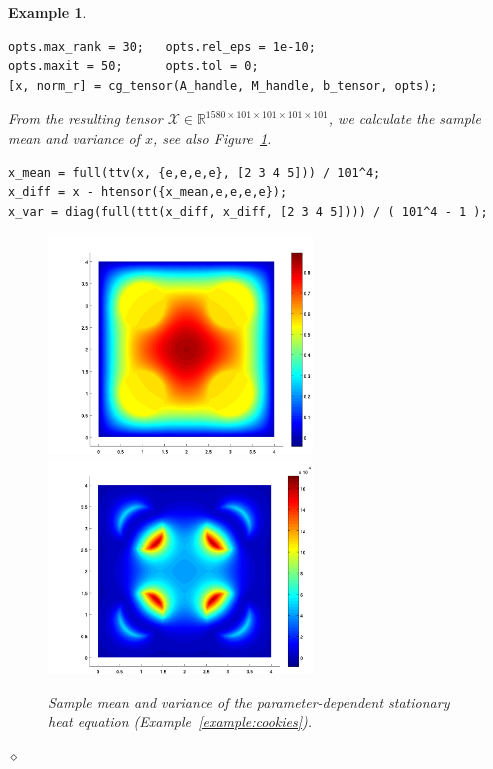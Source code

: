 \documentclass[11pt, a4paper]{article}
\newcommand{\calX}{\mathcal{X}}
\newcommand{\R}{{\mathbb R}}
\newtheorem{example}[theorem]{\bf Example}
\begin{document}
\begin{example}
\begin{framed}
\begin{verbatim}
opts.max_rank = 30;   opts.rel_eps = 1e-10;
opts.maxit = 50;      opts.tol = 0;
[x, norm_r] = cg_tensor(A_handle, M_handle, b_tensor, opts);
\end{verbatim}
\vspace{-2ex} 
\end{framed}

\noindent From the resulting tensor $\calX \in \R^{1580 \times 101 \times 101 \times 101 \times 101}$, we calculate the sample mean and variance of $x$, see also Figure~\ref{fig:cookies_mean_var}.
\begin{framed}\small \noindent
\vspace{-3ex} 
\begin{verbatim}
x_mean = full(ttv(x, {e,e,e,e}, [2 3 4 5])) / 101^4;
x_diff = x - htensor({x_mean,e,e,e,e});
x_var = diag(full(ttt(x_diff, x_diff, [2 3 4 5]))) / ( 101^4 - 1 );
\end{verbatim}
\vspace{-2ex} 
\end{framed}
\begin{figure}
\begin{center}
  \includegraphics[width=7cm]{cookies_mean}
$\qquad$
  \includegraphics[width=7cm]{cookies_var}
\end{center}
\caption{Sample mean and variance of the parameter-dependent stationary heat equation (Example~\ref{example:cookies}).} 
\label{fig:cookies_mean_var}
\end{figure}
\hfill $\diamond$
\end{example}
\end{document}
